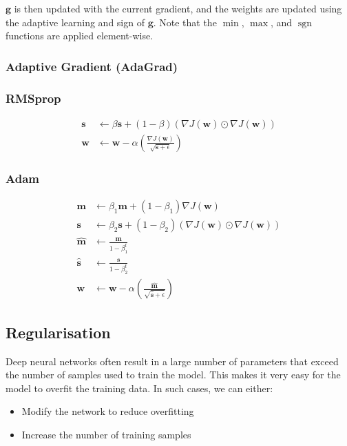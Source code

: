 \documentclass{article}
\DeclareMathOperator{\sgn}{sgn}
\begin{document}
\(\symbf{g}\) is then updated with the current gradient, and the weights
are updated using the adaptive learning and sign of \(\symbf{g}\). Note
that the \(\min\), \(\max\), and \(\sgn\) functions are applied
element-wise.
\subsubsection{Adaptive Gradient (AdaGrad)}

\subsubsection{RMSprop}
\begin{align*}
    \symbf{s} & \leftarrow \beta \symbf{s} + (1 - \beta) \left( \nabla J\left( \symbf{w} \right) \odot \nabla J\left( \symbf{w} \right) \right) \\
    \symbf{w} & \leftarrow \symbf{w} - \alpha \left( \frac{\nabla J\left( \symbf{w} \right)}{\sqrt{\symbf{s} + \epsilon}} \right)
\end{align*}
\subsubsection{Adam}
\begin{align*}
    \symbf{m}       & \leftarrow \beta_1 \symbf{m} + (1 - \beta_1) \nabla J\left( \symbf{w} \right)                                                       \\
    \symbf{s}       & \leftarrow \beta_2 \symbf{s} + (1 - \beta_2) \left( \nabla J\left( \symbf{w} \right) \odot \nabla J\left( \symbf{w} \right) \right) \\
    \hat{\symbf{m}} & \leftarrow \frac{\symbf{m}}{1 - \beta_1^t}                                                                                          \\
    \hat{\symbf{s}} & \leftarrow \frac{\symbf{s}}{1 - \beta_2^t}                                                                                          \\
    \symbf{w}       & \leftarrow \symbf{w} - \alpha \left( \frac{\hat{\symbf{m}}}{\sqrt{\hat{\symbf{s}} + \epsilon}} \right)
\end{align*}
\subsection{Regularisation}
Deep neural networks often result in a large number of parameters that
exceed the number of samples used to train the model. This makes it
very easy for the model to overfit the training data. In such cases, we
can either:
\begin{itemize}
    \item Modify the network to reduce overfitting
    \item Increase the number of training samples
\end{itemize}
\end{document}
